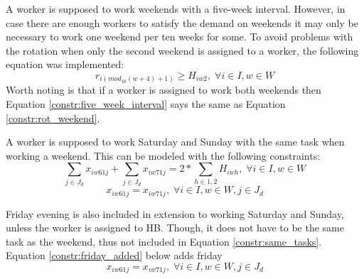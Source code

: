 A worker is supposed to work weekends with a five-week interval. However, in case there are enough workers to satisfy the demand on weekends it may only be necessary to work one weekend per ten weeks for some. To avoid problems with the rotation when only the second weekend is assigned to a worker, the following equation was implemented:
\begin{equation} \label{constr:five_week_interval}
r_{i(mod_{10}(w+4)+1)} \geq H_{iw2}, \; \forall i\in I, w \in W
\end{equation}
Worth noting is that if a worker is assigned to work both weekends then Equation \ref{constr:five_week_interval} says the same as Equation \ref{constr:rot_weekend}.

A worker is supposed to work Saturday and Sunday with the same task when working a weekend. This can be modeled with the following constraints:
\begin{equation} \label{constr:consecutive_days}
\sum_{j \in J_d} x_{iw61j} + \sum_{j \in J_d} x_{iw71j} = 2*\sum_{h \in 1,2} H_{iwh}, \; \forall i\in I, w \in W
\end{equation}
\begin{equation} \label{constr:same_tasks}
x_{iw61j} = x_{iw71j}, \; \forall i\in I, w \in W, j \in J_d
\end{equation}

Friday evening is also included in extension to working Saturday and Sunday, unless the worker is assigned to HB. Though, it does not have to be the same task as the weekend, thus not included in Equation \ref{constr:same_tasks}. Equation \ref{constr:friday_added} below adds friday
\begin{equation} \label{constr:friday_added}
x_{iw61j} = x_{iw71j}, \; \forall i\in I, w \in W, j \in J_d
\end{equation}
